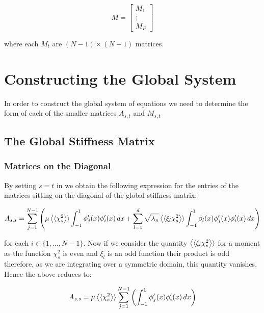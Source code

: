 \begin{equation}
    M = \left[\begin{array}{c}
            M_1 \\
            \vdots \\
            M_P
        \end{array}\right]
\end{equation}

where each $M_t$ are $(N - 1) \times (N + 1) $ matrices.

\section{Constructing the Global System}

In order to construct the global system of equations we need to determine the
form of each of the smaller matrices $A_{s,t}$ and $M_{s,t}$

\subsection{The Global Stiffness Matrix}

\subsubsection{Matrices on the Diagonal}

By setting $s=t$ in  we obtain the following
expression for the entries of the matrices sitting on the diagonal of the
global stiffness matrix:

\begin{equation}
    A_{s,s} = \sum_{j=1}^{N-1}\left(\mu\left\langle\langle\chi_s^2\right\rangle\rangle
        \int_{-1}^1 \phi_j'(x)\phi_i'(x)\, dx
       + \sum_{l=1}^d\sqrt{\lambda_n}\left\langle\langle\xi_l\chi_s^2\right\rangle\rangle
       \int_{-1}^1 \beta_l(x)\phi_j'(x)\phi_i'(x) \, dx\right)
\end{equation}

for each $i \in \{1,\ldots,N-1\}$. Now if we consider the quantity
$\left\langle\langle\xi_l\chi_s^2\right\rangle\rangle$ for a moment as the function $\chi_s^2$ is even and
$\xi_l$ is an odd function their product is odd therefore, as we are integrating
over a symmetric domain, this quantity vanishes. Hence the above reduces to:

\begin{equation}
    A_{s,s} = \mu\left\langle\langle\chi_s^2\right\rangle\rangle\sum_{j=1}^{N - 1}\left(\int_{-1}^1
                \phi_j'(x)\phi_i'(x)\, dx\right)
\end{equation}


